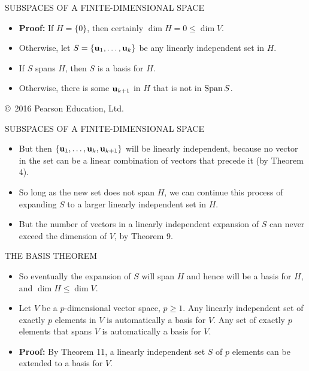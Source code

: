 \begin{frame}[shrink=7]{SUBSPACES OF A FINITE-DIMENSIONAL SPACE}
\begin{itemize}
\item \textbf{Proof:} If $H=\{0\}$, then certainly $\dim H=0\leq\dim V$.
\item Otherwise, let $S=\{\mathbf{u}_1,\ldots,\mathbf{u}_k\}$ be any linearly independent set in $H$.
\item If $S$ spans $H$, then $S$ is a basis for $H$.
\item Otherwise, there is some $\mathbf{u}_{k+1}$ in $H$ that is not in $\operatorname{Span} S$.
\end{itemize}
\vfill
{\tiny \copyright\ 2016 Pearson Education, Ltd.}
\end{frame}

\begin{frame}[shrink=8]{SUBSPACES OF A FINITE-DIMENSIONAL SPACE}
\begin{itemize}
\item But then $\{\mathbf{u}_1,\ldots,\mathbf{u}_k,\mathbf{u}_{k+1}\}$ will be linearly independent, because no vector in the set can be a linear combination of vectors that precede it (by Theorem 4).
\item So long as the new set does not span $H$, we can continue this process of expanding $S$ to a larger linearly independent set in $H$.
\item But the number of vectors in a linearly independent expansion of $S$ can never exceed the dimension of $V$, by Theorem 9.
\end{itemize}
\end{frame}

\begin{frame}[shrink=9]{THE BASIS THEOREM}
\begin{itemize}
\item So eventually the expansion of $S$ will span $H$ and hence will be a basis for $H$, and $\dim H\leq\dim V$.
\item {} Let $V$ be a $p$-dimensional vector space, $p\geq1$. Any linearly independent set of exactly $p$ elements in $V$ is automatically a basis for $V$. Any set of exactly $p$ elements that spans $V$ is automatically a basis for $V$.
\item \textbf{Proof:} By Theorem 11, a linearly independent set $S$ of $p$ elements can be extended to a basis for $V$.
\end{itemize}
\end{frame}

